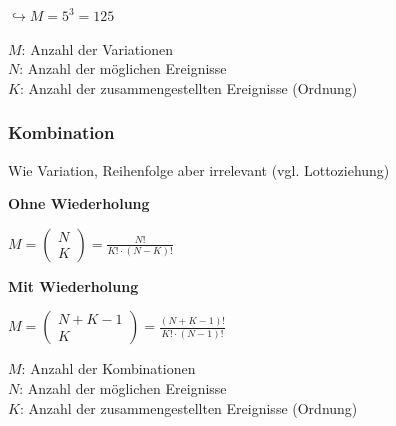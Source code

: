 $\displaystyle{
    \hookrightarrow M = 5^3 = 125
}$

$M$: Anzahl der Variationen\\
$N$: Anzahl der möglichen Ereignisse\\
$K$: Anzahl der zusammengestellten Ereignisse (Ordnung)

\subsubsection{Kombination}

Wie Variation, Reihenfolge aber irrelevant (vgl. Lottoziehung)

\textbf{Ohne Wiederholung}

$\displaystyle{
    M = \begin{pmatrix}
        N\\
        K
    \end{pmatrix}
    = \frac{N!}{K! \cdot (N - K)!}
}$

\textbf{Mit Wiederholung}

$\displaystyle{
    M = \begin{pmatrix}
        N + K - 1\\
        K
    \end{pmatrix} 
    = \frac{(N + K - 1)!}{K! \cdot (N - 1)!}
}$

$M$: Anzahl der Kombinationen\\
$N$: Anzahl der möglichen Ereignisse\\
$K$: Anzahl der zusammengestellten Ereignisse (Ordnung)